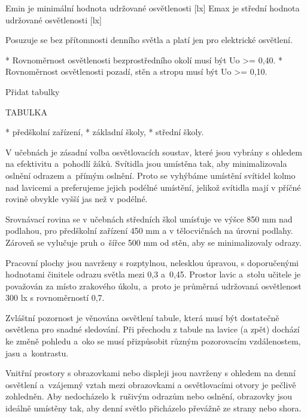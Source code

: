 Emin je minimální hodnota udržované osvětlenosti [lx]
Emax je střední hodnota udržované osvětlenosti [lx]

Posuzuje se bez přítomnosti denního světla  a platí jen pro elektrické osvětlení.

\begitems 
* Rovnoměrnost osvětlenosti bezprostředního okolí musí  být Uo >= 0,40.
* Rovnoměrnost osvětlenosti pozadí, stěn a stropu musí být Uo >= 0,10.
\enditems

Přidat tabulky



TABULKA


\begitems
* předškolní zařízení,
* základní školy,
* střední školy.
\enditems

V učebnách je zásadní volba osvětlovacích soustav, které jsou vybrány s ohledem na efektivitu a~pohodlí žáků.
Svítidla jsou umístěna tak, aby minimalizovala oslnění odrazem a~přímým oslnění. Proto se vyhýbáme umístění svítidel kolmo nad lavicemi
a preferujeme jejich podélné umístění, jelikož svítidla mají v příčné rovině obvykle vyšší jas než v podélné.

Srovnávací rovina se v učebnách středních škol umísťuje ve výšce 850 mm nad podlahou, pro předškolní zařízení 450 mm
a v tělocvičnách na úrovni podlahy.
Zároveň se vylučuje pruh o~šířce 500 mm od stěn, aby se minimalizovaly odrazy.

Pracovní plochy jsou navrženy s rozptylnou, nelesklou úpravou, s doporučenými hodnotami činitele odrazu světla mezi 0,3 a~0,45.
Prostor lavic a~stolu učitele je považován za místo zrakového úkolu,
a~proto je průměrná udržovaná osvětlenost 300 lx s rovnoměrností 0,7.

Zvláštní pozornost je věnována osvětlení tabule, která musí být dostatečně osvětlena pro snadné sledování.
Při přechodu z tabule na lavice (a zpět) dochází ke změně pohledu a~oko se musí přizpůsobit
různým pozorovacím vzdálenostem, jasu a~kontrastu.

Vnitřní prostory s obrazovkami nebo displeji jsou navrženy s ohledem na denní osvětlení a~vzájemný vztah mezi obrazovkami
a osvětlovacími otvory je pečlivě zohledněn. Aby nedocházelo k~rušivým odrazům nebo oslnění, obrazovky jsou ideálně umístěny tak,
aby denní světlo přicházelo převážně ze strany nebo shora.











